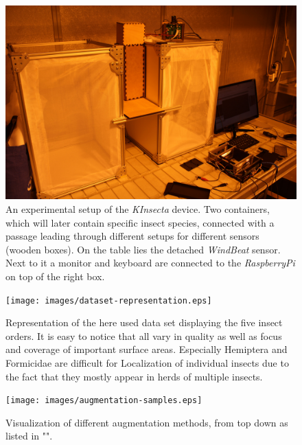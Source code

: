 \begin{figure}[!ht]
    \begin{minipage}{\textwidth}
        \centering
        \includegraphics[width=\textwidth]{images/experimental-setup.JPG}
        \caption{An experimental setup of the \textit{KInsecta} device. Two containers, which will later contain specific insect species, connected with a passage leading through different setups for different sensors (wooden boxes). On the table lies the detached \textit{WindBeat} sensor. Next to it a monitor and keyboard are connected to the \textit{RaspberryPi} on top of the right box.}
        \label{fig:experiment-setup}
    \end{minipage}
\end{figure}

\begin{figure}[!ht]
    \centering
    \texttt{[image: images/dataset-representation.eps]}
    \caption{Representation of the here used data set displaying the five insect orders. It is easy to notice that all vary in quality as well as focus and coverage of important surface areas. Especially Hemiptera and Formicidae are difficult for Localization of individual insects due to the fact that they mostly appear in herds of multiple insects.}
    \label{fig:dataset-overview}
\end{figure}

\begin{figure}[!ht]
    \centering
    \texttt{[image: images/augmentation-samples.eps]}
    \caption{Visualization of different augmentation methods, from top down as listed in "".}
    \label{fig:augmentation-samples}
\end{figure}


